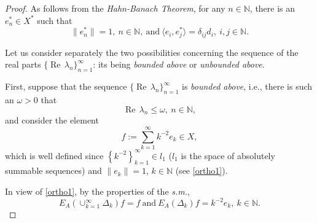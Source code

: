 \documentclass{amsart}
\theoremstyle{plain}
\theoremstyle{definition}
\begin{document}
\begin{proof}
As follows from the {\it Hahn-Banach Theorem}, for any $n\in{{\mathbb N}}$, there is an $e^*_n\in X^*$ such that 
\begin{equation}\label{H-B1}
\|e_n^*\|=1,\ n\in{{\mathbb N}},\ \text{and}\ \langle e_i,e_j^*\rangle=\delta_{ij}d_i,\ i,j\in{{\mathbb N}}.
\end{equation}

Let us consider separately the two possibilities concerning the sequence of the real parts $\{\operatorname{Re\,}\lambda_n\}_{n=1}^\infty$: its being \textit{bounded above} or \textit{unbounded above}. 

First, suppose that the sequence $\{\operatorname{Re\,}\lambda_n\}_{n=1}^\infty$ is \textit{bounded above}, i.e., there is such an $\omega>0$ that
\begin{equation}\label{bounded1}
\operatorname{Re\,}\lambda_n \le \omega,\ n\in{{\mathbb N}},
\end{equation}
and consider the element
\begin{equation*}
f:=\sum_{k=1}^\infty k^{-2}e_k\in X,
\end{equation*}
which is well defined since $\left\{k^{-2}\right\}_{k=1}^\infty\in l_1$ ($l_1$ is the space of absolutely summable sequences) and $\|e_k\|=1$, $k\in{{\mathbb N}}$ (see \eqref{ortho1}).

In view of \eqref{ortho1}, by the properties of the \textit{s.m.},
\begin{equation}\label{vectors1}
E_A(\cup_{k=1}^\infty\Delta_k)f=f\ \text{and}\ E_A(\Delta_k)f=k^{-2}e_k,\ k\in{{\mathbb N}}.
\end{equation}


\end{proof}
\end{document}
